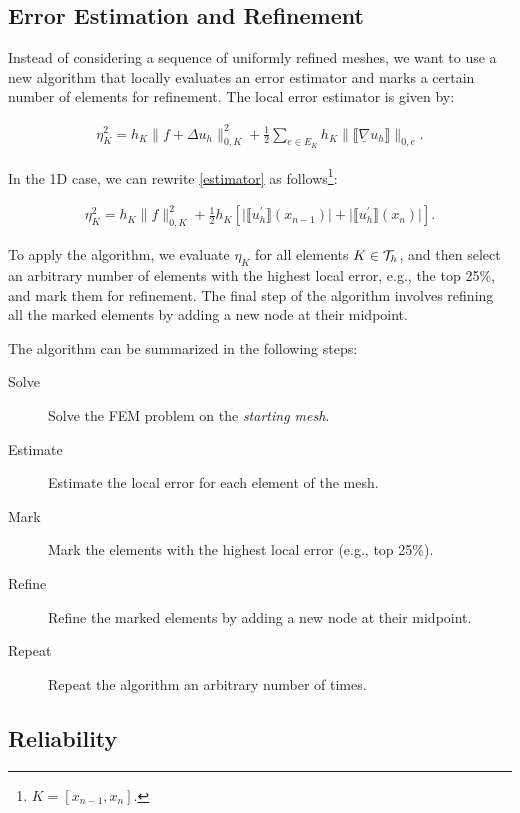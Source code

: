 \subsection{Error Estimation and Refinement}

Instead of considering a sequence of uniformly refined meshes, we want to use a new algorithm that locally evaluates an error estimator and marks a certain number of elements for refinement. The local error estimator is given by:

\begin{gather} \label{estimator}
	\eta_K^2 = h_K \lVert f + \Delta u_h \rVert_{0, K}^2 + \frac{1}{2} \sum_{e \in E_K} h_K \lVert \llbracket \underline{\nabla} u_h \rrbracket \rVert_{0, e}.
\end{gather}

In the 1D case, we can rewrite \ref{estimator} as follows\footnote{$K = [x_{n - 1}, x_n]$.}:

\begin{gather}
	\eta_K^2 = h_K \lVert f \rVert_{0, K}^2 + \frac{1}{2} h_K \left[ \lvert \llbracket u_h^\prime \rrbracket (x_{n - 1}) \rvert + \lvert \llbracket u_h^\prime \rrbracket (x_n) \rvert \right].
\end{gather}

To apply the algorithm, we evaluate $\eta_K$ for all elements $K \in \mathcal{T}_h$, and then select an arbitrary number of elements with the highest local error, e.g., the top 25\%, and mark them for refinement. The final step of the algorithm involves refining all the marked elements by adding a new node at their midpoint.

The algorithm can be summarized in the following steps:

\begin{description}
	\item[Solve] Solve the FEM problem on the \textit{starting mesh}.
	\item[Estimate] Estimate the local error for each element of the mesh.
	\item[Mark] Mark the elements with the highest local error (e.g., top 25\%).
	\item[Refine] Refine the marked elements by adding a new node at their midpoint.  
	\item[Repeat] Repeat the algorithm an arbitrary number of times. 
\end{description}

\newpage
\subsection{Reliability}

